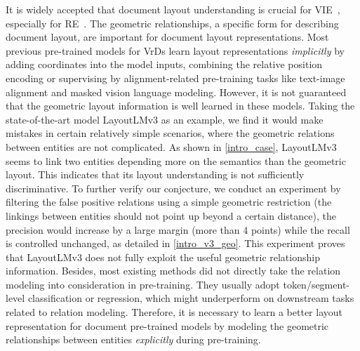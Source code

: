 \documentclass[10pt,twocolumn,letterpaper]{article}
\begin{document}
It is widely accepted that document layout understanding is crucial for VIE~\cite{xu2020layoutlm,xu2021layoutxlm,xu2020layoutlmv2,huang2022layoutlmv3,li2021structext,li2021selfdoc,appalaraju2021docformer,gu2022unified,wang2022lilt,gu2022xylayoutlm,luo2022bivldoc}, especially for RE~\cite{li2021structext,hong2022bros}.
The geometric relationships, a specific form for describing document layout, are important for document layout representations\cite{liu2019graph,luo2020merge,li2021structext}.
Most previous pre-trained models for VrDs learn layout representations \textit{implicitly} by adding coordinates into the model inputs, combining the relative position encoding or supervising by alignment-related pre-training tasks like text-image alignment\cite{xu2020layoutlmv2,huang2022layoutlmv3,luo2022bivldoc} and masked vision language modeling\cite{xu2020layoutlm,xu2021layoutxlm,xu2020layoutlmv2,huang2022layoutlmv3,li2021structext,li2021selfdoc,appalaraju2021docformer,gu2022unified,li2021structext,hong2022bros}.
However, it is not guaranteed that the geometric layout information is well learned in these models.
Taking the state-of-the-art model LayoutLMv3 as an example, we find it would make mistakes in certain relatively simple scenarios, where the geometric relations between entities are not complicated.
As shown in \cref{intro_case}, LayoutLMv3 seems to link two entities depending more on the semantics than the geometric layout.
This indicates that its layout understanding is not sufficiently discriminative. To further verify our conjecture, we conduct an experiment by filtering the false positive relations using a simple geometric restriction (the linkings between entities should not point up beyond a certain distance), the precision would increase by a large margin (more than 4 points) while the recall is controlled unchanged, as detailed in \cref{intro_v3_geo}. This experiment proves that LayoutLMv3 does not fully exploit the useful geometric relationship information.
Besides, most existing methods did not directly take the relation modeling into consideration in pre-training.
They usually adopt token/segment-level classification or regression, which might underperform on downstream tasks related to relation modeling.
Therefore, it is necessary to learn a better layout representation for document pre-trained models by modeling the geometric relationships between entities \textit{explicitly} during pre-training.
\end{document}
